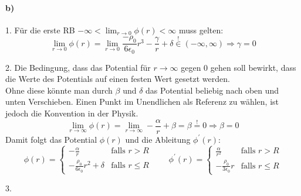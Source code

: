 \documentclass{article}
\newcommand{\epsz}{\epsilon_0}
\begin{document}
\paragraph{b)}
\par{1.}
Für die erste RB $-\infty < \lim_{r\rightarrow 0} \phi(r) < \infty$ muss 
gelten:
\[
	\lim_{r\rightarrow 0} \phi(r) = \lim_{r\rightarrow 0} 
	\frac{- \rho_0 }{6  \epsz} r^3 - \frac \gamma r + \delta
	\overset{!}{\in} (-\infty, \infty)
	\Rightarrow
	\gamma = 0
\]
\par{2.}
Die Bedingung, dass das Potential für $r \rightarrow \infty$ gegen 0 gehen
soll bewirkt, dass die Werte des Potentials auf einen festen Wert gesetzt werden. \\
Ohne diese könnte man durch $\beta$ und $\delta$ das Potential beliebig nach
oben und unten Verschieben. Einen Punkt im Unendlichen als Referenz zu 
wählen, ist jedoch die Konvention in der Physik.
\[
	\lim_{r \rightarrow \infty} \phi(r) = \lim_{r \rightarrow \infty} 
	-\frac{\alpha}{r} + \beta = \beta \overset{!}{=} 0
	\Rightarrow \beta = 0
\]
Damit folgt das Potential $\phi(r)$ und die Ableitung $\phi^\prime(r)$:
\[
	\phi(r) =
	\begin{cases}
		-\frac \alpha r & \text{falls } r > R \\
		-\frac{\rho_0}{6\epsz} r^2 + \delta 
		& \text{falls } r \leq R
	\end{cases}
	\qquad
	\phi^\prime(r) = 
	\begin{cases}
		\frac\alpha{r^2} 
		& \text{falls } r > R \\
		-\frac{\rho_0}{3\epsz} r
		& \text{falls } r \leq R
	\end{cases}
\]
\newpage
\par{3.}
	
\end{document}
